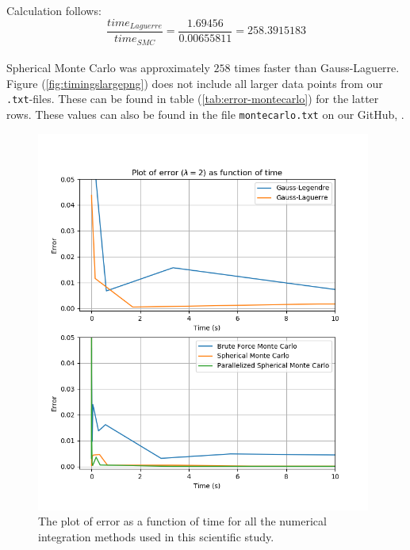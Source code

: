 \documentclass{article}
\begin{document}
Calculation follows: \\

$$\frac{time_{Laguerre}}{time_{SMC}} = \frac{1.69456}{0.00655811} = 258.3915183$$ \\

Spherical Monte Carlo was approximately $258$ times faster than Gauss-Laguerre.\\

Figure (\ref{fig:timingslargepng}) does not include all larger data points from our \texttt{.txt}-files. These can be found in table (\ref{tab:error-montecarlo}) for the latter rows. These values can also be found in the file \texttt{montecarlo.txt} on our GitHub, \cite{github}.

\begin{figure}[ht]
    \centering
    \includegraphics[width = 11cm]{images/method-timings-small.png}
    \caption{The plot of error as a function of time for all the numerical integration methods used in this scientific study. }
    \label{fig:timingssmallpng}
\end{figure}
\end{document}
